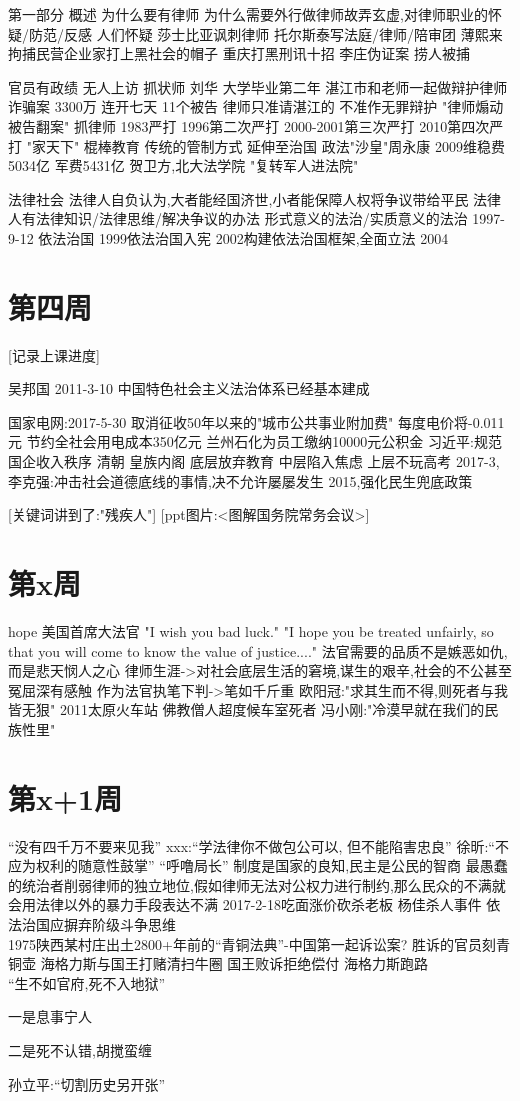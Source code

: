 \documentclass{article}
\begin{document}
\begin{CJK*}{UTF8}{gbsn}
第一部分 概述 为什么要有律师 为什么需要外行做律师故弄玄虚,对律师职业的怀疑/防范/反感 人们怀疑 莎士比亚讽刺律师 托尔斯泰写法庭/律师/陪审团 薄熙来拘捕民营企业家打上黑社会的帽子 重庆打黑刑讯十招 李庄伪证案 捞人被捕

官员有政绩 无人上访 抓状师 刘华 大学毕业第二年 湛江市和老师一起做辩护律师 诈骗案 3300万 连开七天 11个被告 律师只准请湛江的 不准作无罪辩护 "律师煽动被告翻案" 抓律师 1983严打 1996第二次严打 2000-2001第三次严打 2010第四次严打 "家天下" 棍棒教育 传统的管制方式 延伸至治国 政法"沙皇"周永康 2009维稳费5034亿 军费5431亿 贺卫方,北大法学院 "复转军人进法院" 

法律社会 法律人自负认为,大者能经国济世,小者能保障人权将争议带给平民 法律人有法律知识/法律思维/解决争议的办法 形式意义的法治/实质意义的法治 1997-9-12 依法治国 1999依法治国入宪 2002构建依法治国框架,全面立法 2004 


\section{第四周}
[记录上课进度]

吴邦国 2011-3-10 中国特色社会主义法治体系已经基本建成 

国家电网:2017-5-30 取消征收50年以来的"城市公共事业附加费" 每度电价将-0.011元 节约全社会用电成本350亿元 兰州石化为员工缴纳10000元公积金 习近平:规范国企收入秩序 清朝 皇族内阁 底层放弃教育 中层陷入焦虑 上层不玩高考 2017-3,李克强:冲击社会道德底线的事情,决不允许屡屡发生 2015,强化民生兜底政策 

[关键词讲到了:"残疾人"]
[ppt图片:<图解国务院常务会议>]
\section{第x周} hope 
美国首席大法官 "I wish you bad luck." "I hope you be treated unfairly, so that you will come to know the value of justice...." 法官需要的品质不是嫉恶如仇,而是悲天悯人之心 律师生涯->对社会底层生活的窘境,谋生的艰辛,社会的不公甚至冤屈深有感触 作为法官执笔下判->笔如千斤重 欧阳冠:"求其生而不得,则死者与我皆无狠" 2011太原火车站 佛教僧人超度候车室死者 冯小刚:"冷漠早就在我们的民族性里"
\section{第x+1周}
``没有四千万不要来见我'' xxx:``学法律你不做包公可以, 但不能陷害忠良'' 徐昕:``不应为权利的随意性鼓掌'' ``呼噜局长'' 制度是国家的良知,民主是公民的智商 最愚蠢的统治者削弱律师的独立地位,假如律师无法对公权力进行制约,那么民众的不满就会用法律以外的暴力手段表达不满 2017-2-18吃面涨价砍杀老板 杨佳杀人事件 依法治国应摒弃阶级斗争思维 \\
1975陕西某村庄出土2800+年前的``青铜法典''-中国第一起诉讼案? 胜诉的官员刻青铜壶 海格力斯与国王打赌清扫牛圈 国王败诉拒绝偿付 海格力斯跑路 \\
``生不如官府,死不入地狱''
\begin{list}{1}{spacing}
	\item 一是息事宁人
	\item 二是死不认错,胡搅蛮缠
\end{list}
孙立平:``切割历史另开张''


\end{CJK*}
\end{document}

